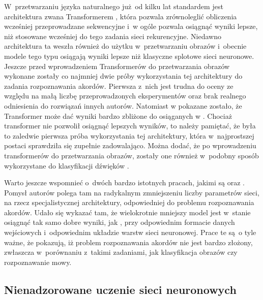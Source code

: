 W~przetwarzaniu języka naturalnego już od kilku lat standardem jest architektura zwana Transformerem \cite{vaswani_attention_2017}, która pozwala zrównoleglić obliczenia wcześniej przeprowadzane sekwencyjne i~w ogóle pozwala osiągnąć wyniki lepsze, niż stosowane wcześniej do tego zadania sieci rekurencyjne. Niedawno architektura ta weszła również do użytku w~przetwarzaniu obrazów \cite{dosovitskiy_image_2021} i~obecnie modele tego typu osiągają wyniki lepsze niż klasyczne splotowe sieci neuronowe. Jeszcze przed wprowadzeniem Transformerów do przetwarzania obrazów wykonane zostały co najmniej dwie próby wykorzystania tej architektury do zadania rozpoznawania akordów. Pierwsza z~nich \cite{chen_harmony_2019} jest trudna do oceny ze względu na małą liczbę przeprowadzonych eksperymentów oraz brak realnego odniesienia do rozwiązań innych autorów. Natomiast w \cite{park_bi-directional_2019} pokazane zostało, że Transformer może dać wyniki bardzo zbliżone do osiąganych w \cite{korzeniowski_fully_2016}. Chociaż transformer nie pozwolił osiągnąć lepszych wyników, to należy pamiętać, że była to zaledwie pierwsza próba wykorzystania tej architektury, która w~najprostszej postaci sprawdziła się zupełnie zadowalająco. Można dodać, że po wprowadzeniu transformerów do przetwarzania obrazów, zostały one również w~podobny sposób wykorzystane do klasyfikacji dźwięków \cite{gong_ast_2021}.

Warto jeszcze wspomnieć o~dwóch bardzo istotnych pracach, jakimi są \cite{hanlon_fifthnet_2020} oraz \cite{ohanlon_fifthnet_2021}. Pomysł autorów polega tam na radykalnym zmniejszeniu liczby parametrów sieci, na rzecz specjalistycznej architektury, odpowiedniej do problemu rozpoznawania akordów. Udało się wykazać tam, że wielokrotnie mniejszy model jest w~stanie osiągnąć tak samo dobre wyniki, jak \cite{korzeniowski_fully_2016}, przy odpowiednim formacie danych wejściowych i~odpowiednim układzie warstw sieci neuronowej. Prace te są o tyle ważne, że pokazują, iż problem rozpoznawania akordów nie jest bardzo złożony, zwłaszcza w~porównaniu z~takimi zadaniami, jak klasyfikacja obrazów czy rozpoznawanie mowy.

\subsection{Nienadzorowane uczenie sieci neuronowych}

